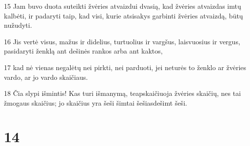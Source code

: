 \par 15 Jam buvo duota suteikti žvėries atvaizdui dvasią, kad žvėries atvaizdas imtų kalbėti, ir padaryti taip, kad visi, kurie atsisakys garbinti žvėries atvaizdą, būtų nužudyti. 
\par 16 Jis vertė visus, mažus ir didelius, turtuolius ir vargšus, laisvuosius ir vergus, pasidaryti ženklą ant dešinės rankos arba ant kaktos, 
\par 17 kad nė vienas negalėtų nei pirkti, nei parduoti, jei neturės to ženklo ar žvėries vardo, ar jo vardo skaičiaus. 
\par 18 Čia slypi išmintis! Kas turi išmanymą, teapskaičiuoja žvėries skaičių, nes tai žmogaus skaičius; jo skaičius yra šeši šimtai šešiasdešimt šeši.


\chapter{14}


